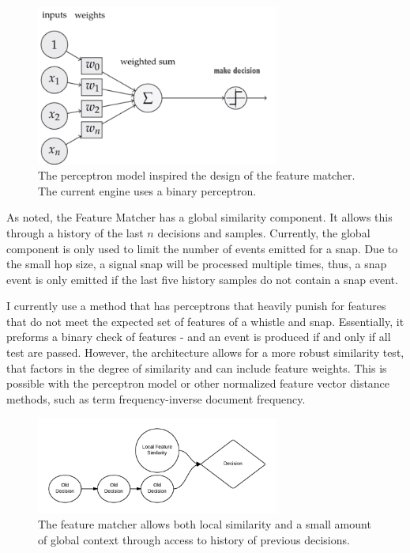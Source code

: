 \documentclass[DIV=calc, paper=a4, fontsize=11pt, twocolumn]{scrartcl}   %
\begin{document}
\begin{figure}[h]
   \centering
   \includegraphics[width=80mm]{figures/perceptronmodel.png}
   \caption{The perceptron model inspired the design of the feature matcher. The current engine uses a binary perceptron.}
   \label{overflow}
\end{figure}


\par As noted, the Feature Matcher has a global similarity component. It allows this through a history of the last $n$ decisions and samples. Currently, the global component is only used to limit the number of events emitted for a snap. Due to the small hop size, a signal snap will be processed multiple times, thus, a snap event is only emitted if the last five history samples do not contain a snap event.

\par  I currently use a method that has perceptrons that heavily punish for features that do not meet the expected set of features of a whistle and snap. Essentially, it preforms a binary check of features - and an event is produced if and only if all test are passed.  However, the architecture allows for a more robust similarity test, that factors in the degree of similarity and can include feature weights. This is possible with the perceptron model or other normalized feature vector distance methods, such as term frequency-inverse document frequency.

\begin{figure}[h]
   \centering
   \includegraphics[width=80mm]{figures/FeatureMatcherFuture.png}
   \caption{The feature matcher allows both local similarity and a small amount of global context through access to history of previous decisions.}
   \label{overflow}
\end{figure}
\end{document}
